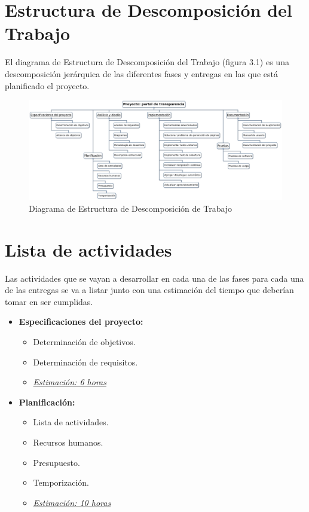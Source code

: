 \section{Estructura de Descomposición del Trabajo}

El diagrama de Estructura de Descomposición del Trabajo (figura 3.1) es una descomposición jerárquica de las diferentes fases y 
entregas en las que está planificado el proyecto.

\begin{figure}[!ht]
  \begin{center}
    \includegraphics[scale=0.25,angle=90]{imagenes/diagrama_edt.png}
    \caption{Diagrama de Estructura de Descomposición de Trabajo}
    \label{fig:diagEdt}
  \end{center}
\end{figure} 

\newpage
\section{Lista de actividades}

Las actividades que se vayan a desarrollar en cada una de las fases para cada una de las entregas se va a listar junto con una 
estimación del tiempo que deberían tomar en ser cumplidas.

\begin{itemize}
   \item \textbf{Especificaciones del proyecto:}
   \begin{itemize}
    \item Determinación de objetivos.
    \item Determinación de requisitos.
    \item \underline{\textit{Estimación: 6 horas}}
    \end{itemize}
\end{itemize}

\begin{itemize}
   \item \textbf{Planificación:}
   \begin{itemize}
    \item Lista de actividades.
    \item Recursos humanos.
    \item Presupuesto.
    \item Temporización.
    \item \underline{\textit{Estimación: 10 horas}}
   \end{itemize}
\end{itemize}

